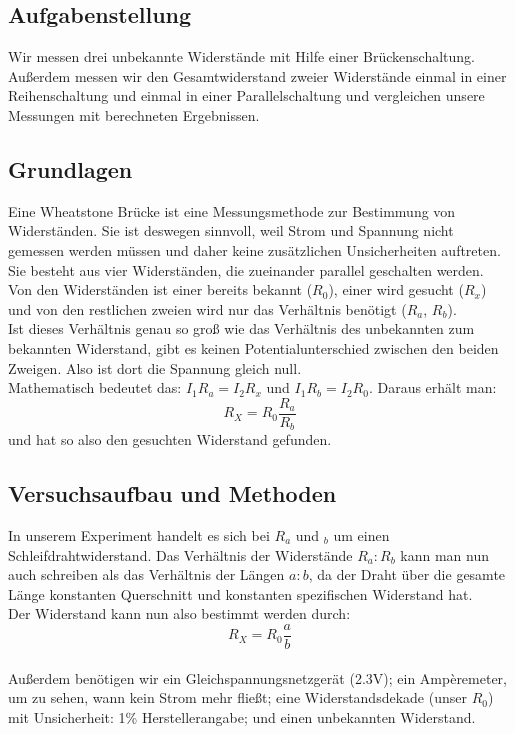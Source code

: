 \documentclass{article}
\begin{document}
\subsection{Aufgabenstellung}
Wir messen drei unbekannte Widerstände mit Hilfe einer Brückenschaltung.
Außerdem messen wir den Gesamtwiderstand zweier Widerstände einmal in einer Reihenschaltung und einmal in einer Parallelschaltung und vergleichen unsere Messungen mit berechneten Ergebnissen.
\subsection{Grundlagen}
Eine Wheatstone Brücke ist eine Messungsmethode zur Bestimmung von Widerständen. Sie ist deswegen sinnvoll, weil Strom und Spannung nicht gemessen werden müssen und daher keine zusätzlichen Unsicherheiten auftreten.\\
Sie besteht aus vier Widerständen, die zueinander parallel geschalten werden. 
Von den Widerständen ist einer bereits bekannt ($R_0$), einer wird gesucht ($R_x$) und von den restlichen zweien wird nur das Verhältnis benötigt ($R_a$, $R_b$).\\
Ist dieses Verhältnis genau so groß wie das Verhältnis des unbekannten zum bekannten Widerstand, gibt es keinen Potentialunterschied zwischen den beiden Zweigen. Also ist dort die Spannung gleich null.\\
Mathematisch bedeutet das: $I_1 R_a = I_2 R_x$ und $I_1 R_b = I_2 R_0$. Daraus erhält man: \\
$$R_X=R_0 \frac{R_a}{R_b}$$
und hat so also den gesuchten Widerstand gefunden. 
 
\subsection{Versuchsaufbau und Methoden}
In unserem Experiment handelt es sich bei $R_a$ und $_b$ um einen Schleifdrahtwiderstand. Das Verhältnis der Widerstände $R_a : R_b$ kann man nun auch schreiben als das Verhältnis der Längen $a : b$, da der Draht über die gesamte Länge konstanten Querschnitt und konstanten spezifischen Widerstand hat.\\
Der Widerstand kann nun also bestimmt werden durch:\\
\begin{equation}
\label{Widerstand}
R_X=R_0 \frac{a}{b}
\end{equation}
\
\\
Außerdem benötigen wir ein Gleichspannungsnetzgerät (2.3V); ein Ampèremeter, um zu sehen, wann kein Strom mehr fließt; eine Widerstandsdekade (unser $R_0$) mit Unsicherheit: 1\% Herstellerangabe; und einen unbekannten Widerstand. 
\end{document}
